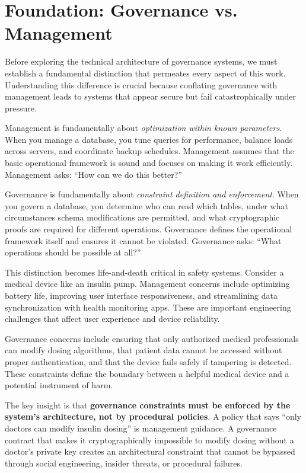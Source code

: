 \section{Foundation: Governance vs. Management}

Before exploring the technical architecture of governance systems, we must establish a fundamental distinction that permeates every aspect of this work. Understanding this difference is crucial because conflating governance with management leads to systems that appear secure but fail catastrophically under pressure.

Management is fundamentally about \textit{optimization within known parameters}. When you manage a database, you tune queries for performance, balance loads across servers, and coordinate backup schedules. Management assumes that the basic operational framework is sound and focuses on making it work efficiently. Management asks: ``How can we do this better?''

Governance is fundamentally about \textit{constraint definition and enforcement}. When you govern a database, you determine who can read which tables, under what circumstances schema modifications are permitted, and what cryptographic proofs are required for different operations. Governance defines the operational framework itself and ensures it cannot be violated. Governance asks: ``What operations should be possible at all?''

This distinction becomes life-and-death critical in safety systems. Consider a medical device like an insulin pump. Management concerns include optimizing battery life, improving user interface responsiveness, and streamlining data synchronization with health monitoring apps. These are important engineering challenges that affect user experience and device reliability.

Governance concerns include ensuring that only authorized medical professionals can modify dosing algorithms, that patient data cannot be accessed without proper authentication, and that the device fails safely if tampering is detected. These constraints define the boundary between a helpful medical device and a potential instrument of harm.

The key insight is that \textbf{governance constraints must be enforced by the system's architecture, not by procedural policies}. A policy that says ``only doctors can modify insulin dosing'' is management guidance. A governance contract that makes it cryptographically impossible to modify dosing without a doctor's private key creates an architectural constraint that cannot be bypassed through social engineering, insider threats, or procedural failures.


